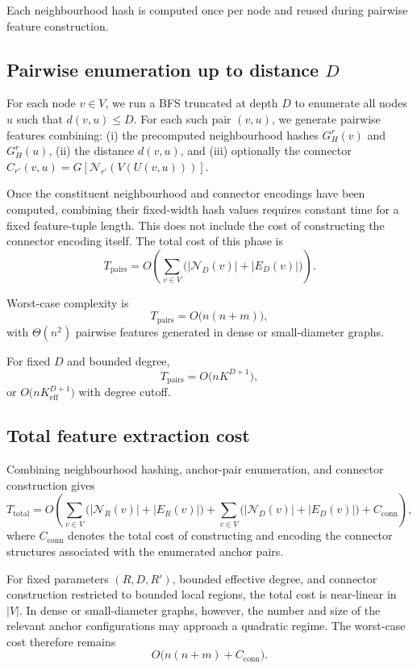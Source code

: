 Each neighbourhood hash is computed once per node and reused during pairwise feature construction.

\subsection{Pairwise enumeration up to distance $D$}

For each node $v\in V$, we run a BFS truncated at depth $D$ to enumerate all nodes $u$ such that $d(v,u)\le D$.  
For each such pair $(v,u)$, we generate pairwise features combining:
(i) the precomputed neighbourhood hashes $G^r_H(v)$ and $G^r_H(u)$,
(ii) the distance $d(v,u)$,
and (iii) optionally the connector
$C_{r'}(v,u)=G[\mathcal{N}_{r'}(V(U(v,u)))]$.

Once the constituent neighbourhood and connector encodings have been computed,
combining their fixed-width hash values requires constant time for a fixed
feature-tuple length. This does not include the cost of constructing the
connector encoding itself.
The total cost of this phase is
\[
T_{\mathrm{pairs}}
=
O\!\left(
\sum_{v\in V}\bigl(|\mathcal{N}_D(v)| + |E_D(v)|\bigr)
\right).
\]

Worst-case complexity is
\[
T_{\mathrm{pairs}} = O\bigl(n(n+m)\bigr),
\]
with $\Theta(n^2)$ pairwise features generated in dense or small-diameter graphs.

For fixed $D$ and bounded degree,
\[
T_{\mathrm{pairs}} = O\bigl(n K^{D+1}\bigr),
\]
or $O\bigl(n K_{\mathrm{eff}}^{D+1}\bigr)$ with degree cutoff.


\subsection{Total feature extraction cost}

Combining neighbourhood hashing, anchor-pair enumeration, and connector
construction gives
\[
T_{\mathrm{total}}
=
O\!\left(
\sum_{v\in V}
\bigl(|\mathcal{N}_R(v)|+|E_R(v)|\bigr)
+
\sum_{v\in V}
\bigl(|\mathcal{N}_D(v)|+|E_D(v)|\bigr)
+
C_{\mathrm{conn}}
\right),
\]
where $C_{\mathrm{conn}}$ denotes the total cost of constructing and encoding
the connector structures associated with the enumerated anchor pairs.

For fixed parameters $(R,D,R')$, bounded effective degree, and connector
construction restricted to bounded local regions, the total cost is
near-linear in $|V|$. In dense or small-diameter graphs, however, the number
and size of the relevant anchor configurations may approach a quadratic
regime. The worst-case cost therefore remains
\[
O\!\bigl(n(n+m)+C_{\mathrm{conn}}\bigr).
\]


